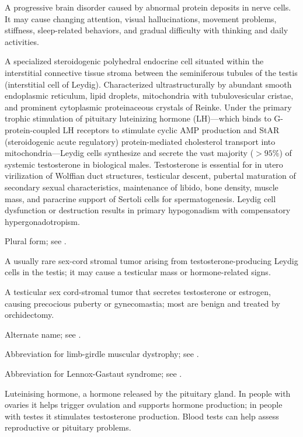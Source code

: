  A progressive brain disorder caused by abnormal protein deposits in nerve cells. It may cause changing attention, visual hallucinations, movement problems, stiffness, sleep-related behaviors, and gradual difficulty with thinking and daily activities.

 A specialized steroidogenic polyhedral endocrine cell situated within the interstitial connective tissue stroma between the seminiferous tubules of the testis (interstitial cell of Leydig). Characterized ultrastructurally by abundant smooth endoplasmic reticulum, lipid droplets, mitochondria with tubulovesicular cristae, and prominent cytoplasmic proteinaceous crystals of Reinke. Under the primary trophic stimulation of pituitary luteinizing hormone (LH)---which binds to G-protein-coupled LH receptors to stimulate cyclic AMP production and StAR (steroidogenic acute regulatory) protein-mediated cholesterol transport into mitochondria---Leydig cells synthesize and secrete the vast majority ($>95\%$) of systemic testosterone in biological males. Testosterone is essential for in utero virilization of Wolffian duct structures, testicular descent, pubertal maturation of secondary sexual characteristics, maintenance of libido, bone density, muscle mass, and paracrine support of Sertoli cells for spermatogenesis. Leydig cell dysfunction or destruction results in primary hypogonadism with compensatory hypergonadotropism.

 Plural form; see .

 A usually rare sex-cord stromal tumor arising from testosterone-producing Leydig cells in the testis; it may cause a testicular mass or hormone-related signs.

 A testicular sex cord-stromal tumor that secretes testosterone or estrogen, causing
precocious puberty or gynecomastia; most are benign and treated by orchidectomy.

 Alternate name; see .

 Abbreviation for limb-girdle muscular dystrophy; see .

 Abbreviation for Lennox-Gastaut syndrome; see .

 Luteinising hormone, a hormone released by the pituitary gland. In people with ovaries it helps trigger ovulation and supports hormone production; in people with testes it stimulates testosterone production. Blood tests can help assess reproductive or pituitary problems.

